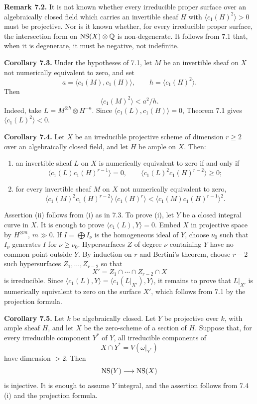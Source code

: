 \documentclass[11pt]{article}
\providecommand{\Q}{\mathbb Q}
\begin{document}
\textbf{Remark 7.2.} It is not known whether every irreducible proper surface over an algebraically closed field which carries an invertible sheaf $H$ with $\langle c_1(H)^2\rangle>0$ must be projective. Nor is it known whether, for every irreducible proper surface, the intersection form on $\NS(X)\otimes\Q$ is non-degenerate. It follows from 7.1 that, when it is degenerate, it must be negative, not indefinite.

\textbf{Corollary 7.3.} Under the hypotheses of 7.1, let $M$ be an invertible sheaf on $X$ not numerically equivalent to zero, and set
\[
   a=\langle c_1(M),c_1(H)\rangle,
   \qquad
   h=\langle c_1(H)^2\rangle.
\]
Then
\[
   \langle c_1(M)^2\rangle<a^2/h.
\]
Indeed, take $L=M^{\otimes h}\otimes H^{-a}$. Since $\langle c_1(L),c_1(H)\rangle=0$, Theorem 7.1 gives $\langle c_1(L)^2\rangle<0$.

\textbf{Corollary 7.4.} Let $X$ be an irreducible projective scheme of dimension $r\ge2$ over an algebraically closed field, and let $H$ be ample on $X$. Then:
\begin{enumerate}[label=\roman*)]
\item an invertible sheaf $L$ on $X$ is numerically equivalent to zero if and only if
\[
   \langle c_1(L)c_1(H)^{r-1}\rangle=0,
   \qquad
   \langle c_1(L)^2c_1(H)^{r-2}\rangle\ge0;
\]
\item for every invertible sheaf $M$ on $X$ not numerically equivalent to zero,
\[
   \langle c_1(M)^2c_1(H)^{r-2}\rangle\,\langle c_1(H)^r\rangle
   <\langle c_1(M)c_1(H)^{r-1}\rangle^2.
\]
\end{enumerate}
Assertion (ii) follows from (i) as in 7.3. To prove (i), let $Y$ be a closed integral curve in $X$. It is enough to prove $\langle c_1(L),Y\rangle=0$. Embed $X$ in projective space by $H^{\otimes m}$, $m\gg0$. If $I=\bigoplus I_\nu$ is the homogeneous ideal of $Y$, choose $\nu_0$ such that $I_\nu$ generates $I$ for $\nu\ge\nu_0$. Hypersurfaces $Z$ of degree $\nu$ containing $Y$ have no common point outside $Y$. By induction on $r$ and Bertini's theorem, choose $r-2$ such hypersurfaces $Z_1,\ldots,Z_{r-2}$ so that
\[
   X'=Z_1\cap\cdots\cap Z_{r-2}\cap X
\]
is irreducible. Since $\langle c_1(L),Y\rangle=\langle c_1(L|_{X'}),Y\rangle$, it remains to prove that $L|_{X'}$ is numerically equivalent to zero on the surface $X'$, which follows from 7.1 by the projection formula.

\textbf{Corollary 7.5.} Let $k$ be algebraically closed. Let $Y$ be projective over $k$, with ample sheaf $H$, and let $X$ be the zero-scheme of a section of $H$. Suppose that, for every irreducible component $Y^*$ of $Y$, all irreducible components of
\[
   X\cap Y^*=V(\omega|_{Y^*})
\]
have dimension $>2$. Then
\[
   \operatorname{NS}(Y)\longrightarrow \operatorname{NS}(X)
\]
is injective. It is enough to assume $Y$ integral, and the assertion follows from 7.4 (i) and the projection formula.
\end{document}
